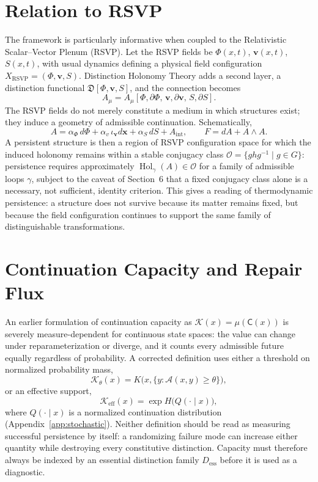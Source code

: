 \documentclass[11pt]{article}
\newcommand{\C}{\mathsf{C}}
\newcommand{\Hol}{\operatorname{Hol}}
\begin{document}
\section{Relation to RSVP}

The framework is particularly informative when coupled to the Relativistic Scalar--Vector Plenum (RSVP). Let the RSVP fields be $\Phi(x,t)$, $\mathbf{v}(x,t)$, $S(x,t)$, with usual dynamics defining a physical field configuration $X_{\text{RSVP}} = (\Phi, \mathbf{v}, S)$. Distinction Holonomy Theory adds a second layer, a distinction functional $\mathfrak{D}[\Phi, \mathbf{v}, S]$, and the connection becomes
\[
A_\mu = A_\mu[\Phi, \partial\Phi,\, \mathbf{v}, \partial\mathbf{v},\, S, \partial S].
\]
The RSVP fields do not merely constitute a medium in which structures exist; they induce a geometry of admissible continuation. Schematically,
\[
A = \alpha_\Phi\, d\Phi + \alpha_v\, \iota_{\mathbf{v}} d\mathbf{x} + \alpha_S\, dS + A_{\text{int}}, \qquad F = dA + A \wedge A.
\]
A persistent structure is then a region of RSVP configuration space for which the induced holonomy remains within a stable conjugacy class $\mathcal{O} = \{ g h g^{-1} \mid g \in G \}$: persistence requires approximately $\Hol_\gamma(A) \in \mathcal{O}$ for a family of admissible loops $\gamma$, subject to the caveat of Section~6 that a fixed conjugacy class alone is a necessary, not sufficient, identity criterion. This gives a reading of thermodynamic persistence: a structure does not survive because its matter remains fixed, but because the field configuration continues to support the same family of distinguishable transformations.

\section{Continuation Capacity and Repair Flux}

An earlier formulation of continuation capacity as $\mathcal{K}(x) = \mu(\C(x))$ is severely measure-dependent for continuous state spaces: the value can change under reparameterization or diverge, and it counts every admissible future equally regardless of probability. A corrected definition uses either a threshold on normalized probability mass,
\[
\mathcal{K}_\theta(x) = K\bigl(x, \{y : \mathcal{A}(x,y) \geq \theta\}\bigr),
\]
or an effective support,
\[
\mathcal{K}_{\mathrm{eff}}(x) = \exp H\bigl(Q(\cdot \mid x)\bigr),
\]
where $Q(\cdot \mid x)$ is a normalized continuation distribution (Appendix~\ref{app:stochastic}). Neither definition should be read as measuring successful persistence by itself: a randomizing failure mode can increase either quantity while destroying every constitutive distinction. Capacity must therefore always be indexed by an essential distinction family $D_{\mathrm{ess}}$ before it is used as a diagnostic.
\end{document}
